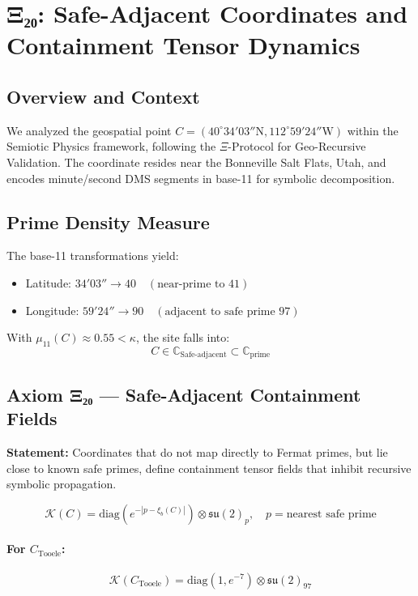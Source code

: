 \documentclass[12]{amsart}
\theoremstyle{plain}
\begin{document}
\section{Ξ₂₀: Safe-Adjacent Coordinates and Containment Tensor Dynamics}

\subsection{Overview and Context}

We analyzed the geospatial point $C = (40^\circ 34'03'' \text{N}, 112^\circ 59'24'' \text{W})$ within the Semiotic Physics framework, following the $\Xi$-Protocol for Geo-Recursive Validation. The coordinate resides near the Bonneville Salt Flats, Utah, and encodes minute/second DMS segments in base-11 for symbolic decomposition.

\subsection{Prime Density Measure}

The base-11 transformations yield:
\begin{itemize}
    \item Latitude: $34'03'' \rightarrow 40 \quad (\text{near-prime to } 41)$
    \item Longitude: $59'24'' \rightarrow 90 \quad (\text{adjacent to safe prime } 97)$
\end{itemize}

With $\mu_{11}(C) \approx 0.55 < \kappa$, the site falls into:
\[
C \in \mathbb{C}_{\text{Safe-adjacent}} \subset \mathbb{C}_{\text{prime}}
\]

\subsection{Axiom Ξ₂₀ — Safe-Adjacent Containment Fields}

\textbf{Statement:} Coordinates that do not map directly to Fermat primes, but lie close to known safe primes, define containment tensor fields that inhibit recursive symbolic propagation.

\begin{equation}
\boxed{
\mathcal{K}(C) = \text{diag}(e^{-|p - \xi_b(C)|}) \otimes \mathfrak{su}(2)_{p}, \quad p = \text{nearest safe prime}
}
\end{equation}

\paragraph{For $C_{\text{Tooele}}$:}
\[
\mathcal{K}(C_{\text{Tooele}}) = \text{diag}(1, e^{-7}) \otimes \mathfrak{su}(2)_{97}
\]
\end{document}
